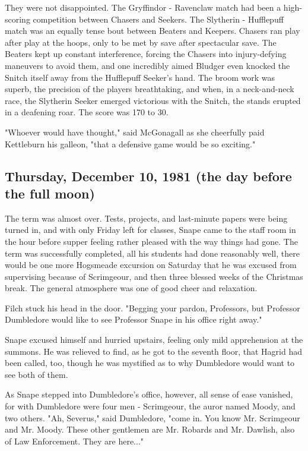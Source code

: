 They were not disappointed. The Gryffindor - Ravenclaw match had been a high-scoring competition between Chasers and Seekers. The Slytherin - Hufflepuff match was an equally tense bout between Beaters and Keepers. Chasers ran play after play at the hoops, only to be met by save after spectacular save. The Beaters kept up constant interference, forcing the Chasers into injury-defying maneuvers to avoid them, and one incredibly aimed Bludger even knocked the Snitch itself away from the Hufflepuff Seeker's hand. The broom work was superb, the precision of the players breathtaking, and when, in a neck-and-neck race, the Slytherin Seeker emerged victorious with the Snitch, the stands erupted in a deafening roar. The score was 170 to 30.

"Whoever would have thought," said McGonagall as she cheerfully paid Kettleburn his galleon, "that a defensive game would be so exciting."

\subsection{Thursday, December 10, 1981 (the day before the full moon)}

The term was almost over. Tests, projects, and last-minute papers were being turned in, and with only Friday left for classes, Snape came to the staff room in the hour before supper feeling rather pleased with the way things had gone. The term was successfully completed, all his students had done reasonably well, there would be one more Hogsmeade excursion on Saturday that he was excused from supervising because of Scrimgeour, and then three blessed weeks of the Christmas break. The general atmosphere was one of good cheer and relaxation.

Filch stuck his head in the door. "Begging your pardon, Professors, but Professor Dumbledore would like to see Professor Snape in his office right away."

Snape excused himself and hurried upstairs, feeling only mild apprehension at the summons. He was relieved to find, as he got to the seventh floor, that Hagrid had been called, too, though he was mystified as to why Dumbledore would want to see both of them.

As Snape stepped into Dumbledore's office, however, all sense of ease vanished, for with Dumbledore were four men - Scrimgeour, the auror named Moody, and two others. "Ah, Severus," said Dumbledore, "come in. You know Mr. Scrimgeour and Mr. Moody. These other gentlemen are Mr. Robards and Mr. Dawlish, also of Law Enforcement. They are here..."

